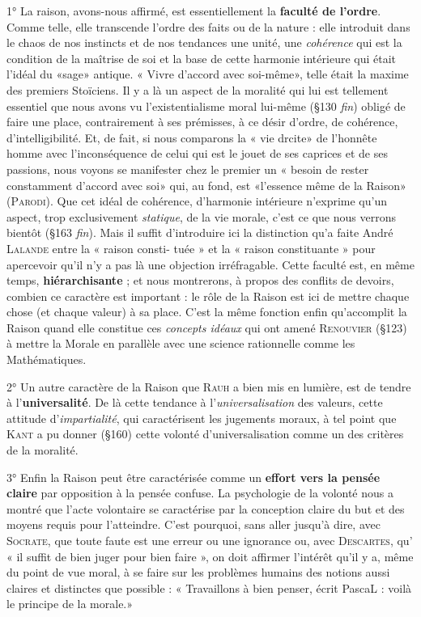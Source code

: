 1° La raison, avons-nous affirmé, est essentiellement la {\bf faculté
de l’ordre}. Comme telle, elle transcende l’ordre des faits ou de la
nature : elle introduit dans le chaos de nos instincts et de nos tendances
une unité, une {\it cohérence} qui est la condition de la maîtrise de soi et
la base de cette harmonie intérieure qui était l'idéal du «sage»
antique. « Vivre d’accord avec soi-même», telle était la maxime des
premiers Stoïciens. Il y a là un aspect de la moralité qui lui est tellement
essentiel que nous avons vu l’existentialisme moral lui-même
(\S 130 {\it fin}) obligé de faire une place, contrairement à ses prémisses,
à ce désir d’ordre, de cohérence, d’intelligibilité. Et, de fait, si nous
comparons la « vie drcite» de l’honnête homme avec l’inconséquence
de celui qui est le jouet de ses caprices et de ses passions, nous voyons
se manifester chez le premier un « besoin de rester constamment
d’accord avec soi» qui, au fond, est «l'essence même de la Raison»
(\textsc{Parodi}). Que cet idéal de cohérence, d'harmonie intérieure n’exprime
qu’un aspect, trop exclusivement {\it statique}, de la vie morale, c'est ce
que nous verrons bientôt (\S 163 {\it fin}). Mais il suffit d'introduire ici
la distinction qu’a faite André \textsc{Lalande} entre la « raison consti-
tuée » et la « raison constituante » pour apercevoir qu’il n’y a pas
là une objection irréfragable. Cette faculté est, en même temps,
{\bf hiérarchisante} ; et nous montrerons, à propos des conflits de devoirs,
combien ce caractère est important : le rôle de la Raison est ici de
mettre chaque chose (et chaque valeur) à sa place. C’est la même
fonction enfin qu’accomplit la Raison quand elle constitue ces {\it concepts
idéaux} qui ont amené \textsc{Renouvier} (\S 123) à mettre la Morale en
parallèle avec une science rationnelle comme les Mathématiques.

2° Un autre caractère de la Raison que \textsc{Rauh} a bien mis en lumière,
est de tendre à l’{\bf universalité}. De là cette tendance à l’{\it universalisation}
des valeurs, cette attitude d’{\it impartialité}, qui caractérisent les
jugements moraux, à tel point que \textsc{Kant} a pu donner (\S 160) cette
volonté d’universalisation comme un des critères de la moralité.

3° Enfin la Raison peut être caractérisée comme un {\bf effort vers la
pensée claire} par opposition à la pensée confuse. La psychologie
de la volonté nous a montré que l’acte volontaire se caractérise par
la conception claire du but et des moyens requis pour l’atteindre.
C’est pourquoi, sans aller jusqu’à dire, avec \textsc{Socrate}, que toute faute
est une erreur ou une ignorance ou, avec \textsc{Descartes}, qu’ « il suffit de
bien juger pour bien faire », on doit affirmer l’intérêt qu’il y a, même
du point de vue moral, à se faire sur les problèmes humains des
notions aussi claires et distinctes que possible : « Travaillons à bien
penser, écrit PascaL : voilà le principe de la morale.»

